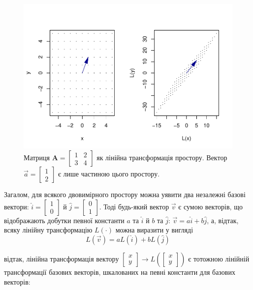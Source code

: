 \documentclass[
  11pt,
]{book}
\begin{document}
\begin{figure}
\centering
\includegraphics{bookdown-demo_files/figure-latex/fig-3-8-1.pdf}
\caption{\label{fig:fig-3-8}Матриця \(\mathbf{A} = \begin{bmatrix} 1 & 2 \\ 3 & 4 \end{bmatrix}\) як лінійна трансформація простору. Вектор \(\vec{a} = \begin{bmatrix} 1 \\ 2 \end{bmatrix}\) є лише частиною цього простору.}
\end{figure}

Загалом, для всякого двовимірного простору можна уявити два незалежні базові вектори: \(\hat{i} = \begin{bmatrix} 1 \\ 0 \end{bmatrix}\) й \(\hat{j} = \begin{bmatrix} 0 \\ 1 \end{bmatrix}\). Тоді будь-який вектор \(\vec{v}\) є сумою векторів, що відображають добутки певної константи \(a\) та \(\hat{i}\) й \(b\) та \(\hat{j}\): \(\vec{v} = a \hat{i} + b \hat{j}\), а, відтак, всяку лінійну трансформацію \(L(\cdot)\) можна виразити у вигляді \[L(\vec{v}) = a L(\hat{i}) + b L(\hat{j})\]

відтак, лінійна трансформація вектору \(\begin{bmatrix} x \\ y \end{bmatrix} \rightarrow L \left( \begin{bmatrix} x \\ y \end{bmatrix} \right)\) є тотожною лінійній трансформації базових векторів, шкалованих на певні константи для базових векторів:
\end{document}
